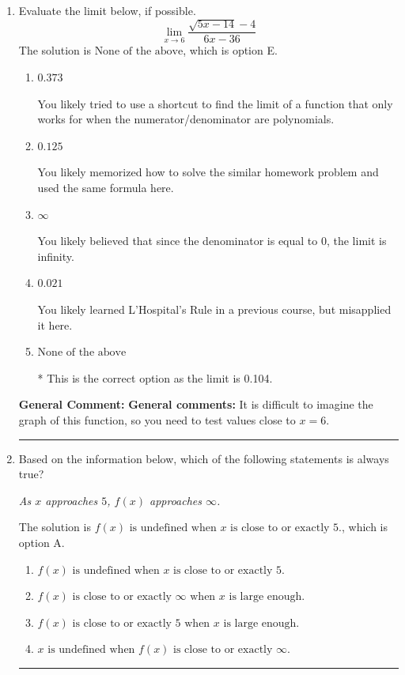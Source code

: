 \documentclass{extbook}[14pt]
\newcommand{\litem}[1]{\item #1

\rule{\textwidth}{0.4pt}}
\begin{document}
\begin{enumerate}\litem{
Evaluate the limit below, if possible.
\[ \lim_{x \rightarrow 6} \frac{\sqrt{5x - 14} - 4}{6x - 36} \]The solution is \( \text{None of the above} \), which is option E.\begin{enumerate}[label=\Alph*.]
\item \( 0.373 \)

You likely tried to use a shortcut to find the limit of a function that only works for when the numerator/denominator are polynomials.
\item \( 0.125 \)

You likely memorized how to solve the similar homework problem and used the same formula here.
\item \( \infty \)

You likely believed that since the denominator is equal to 0, the limit is infinity.
\item \( 0.021 \)

You likely learned L'Hospital's Rule in a previous course, but misapplied it here.
\item \( \text{None of the above} \)

* This is the correct option as the limit is 0.104.
\end{enumerate}

\textbf{General Comment:} \textbf{General comments:} It is difficult to imagine the graph of this function, so you need to test values close to $x = 6$.
}
\litem{
Based on the information below, which of the following statements is always true?

\begin{center}
    \textit{ As $x$ approaches $5$, $f(x)$ approaches $\infty$. }
\end{center}
The solution is \( f(x) \text{ is undefined when } x \text{ is close to or exactly } 5. \), which is option A.\begin{enumerate}[label=\Alph*.]
\item \( f(x) \text{ is undefined when } x \text{ is close to or exactly } 5. \)


\item \( f(x) \text{ is close to or exactly } \infty \text{ when } x \text{ is large enough}. \)


\item \( f(x) \text{ is close to or exactly } 5 \text{ when } x \text{ is large enough}. \)


\item \( x \text{ is undefined when } f(x) \text{ is close to or exactly } \infty. \)



\end{enumerate}}
\end{enumerate}
\end{document}
